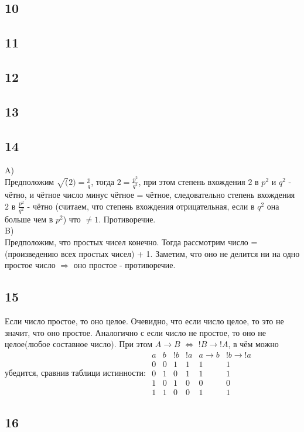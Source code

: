 		\subsection{10}
	
		\subsection{11}
		
		\subsection{12}
		
		\subsection{13}
		
		\subsection{14}
		A)\\
		Предположим $\sqrt(2) = \frac{p}{q}$, тогда $2 = \frac{p^2}{q^2}$, при этом степень вхождения $2$ в $p^2$ и $q^2$ - чётно, и чётное число минус чётное = чётное, следовательно степень вхождения $2$ в $\frac{p^2}{q^2}$ - чётно (считаем, что степень вхождения отрицательная, если в $q^2$ она больше чем в $p^2$) что $\ne 1$. Противоречие.\\
		B)\\
		Предположим, что простых чисел конечно. Тогда рассмотрим число = (произведению всех простых чисел) + 1. Заметим, что оно не делится ни на одно простое число $\Longrightarrow$ оно простое - противоречие.
		
		\subsection{15}
		Если число простое, то оно целое. Очевидно, что если число целое, то это не значит, что оно простое. Аналогично с если число не простое, то оно не целое(любое составное число). При этом $A \longrightarrow B$ $\Longleftrightarrow$ $!B \longrightarrow !A$, в чём можно убедится, сравнив таблици истинности:
		$
		\begin{matrix}
			a & b & !b & !a & a \longrightarrow b & !b \longrightarrow !a \\
			0 & 0 & 1 & 1 & 1 & 1 \\
			0 & 1 & 0 & 1 & 1 & 1 \\
			1 & 0 & 1 & 0 & 0 & 0 \\
			1 & 1 & 0 & 0 & 1 & 1 			
		\end{matrix}
		$
		
		\subsection{16}